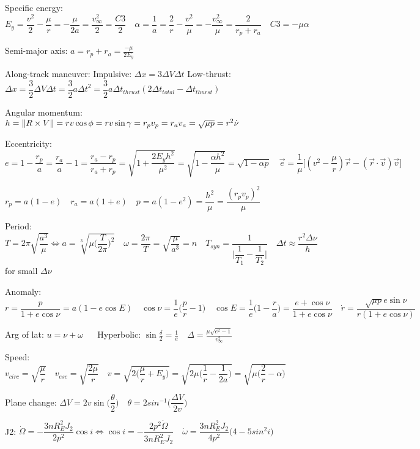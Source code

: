 \documentclass[11pt,landscape]{article}
\begin{document}
Specific energy:
$
E_y 
= \dfrac{v^2}{2} - \dfrac{\mu}{r} 
= -\dfrac{\mu}{2a} 
= \dfrac{v_{\infty}^2}{2} 
= \dfrac{C3}{2}
\quad
\alpha
= \dfrac{1}{a}
= \dfrac{2}{r} - \dfrac{v^2}{\mu}
= -\dfrac{v_{\infty}^2}{\mu}
= \dfrac{2}{r_p+r_a}
\quad
C3 = -\mu\alpha
$

Semi-major axis:
$
a
= r_p + r_a
= \frac{-\mu}{2 E_y}
$


Along-track maneuver:
\quad
Impulsive:
$\Delta x = 3 \Delta V \Delta t$
\quad
Low-thrust:
$
\Delta x 
= \dfrac{3}{2} \Delta V \Delta t 
= \dfrac{3}{2} a {\Delta t}^2
= \dfrac{3}{2} a \Delta t_{thrust} ( 2\Delta t_{total} - \Delta t_{thurst} )
$

Angular momentum:
$
h
=\left\lVert R \times V \right\rVert
=rv \cos \phi
=rv \sin \gamma
=r_p v_p
=r_a v_a
=\sqrt{\mu p}
=r^2 \dot{\nu}
$

Eccentricity:
$
e 
=1-\dfrac{r_p}{a}
=\dfrac{r_a}{a}-1
=\dfrac{r_a-r_p}{r_a+r_p}
=\sqrt{1+\dfrac{2 E_y h^2}{\mu^2}}
=\sqrt{1-\dfrac{\alpha h^2}{\mu}}
=\sqrt{1-\alpha p}
\quad
\vec{e} = \dfrac{1}{\mu} 
\big[ (v^2-\dfrac{\mu}{r})\vec{r} - (\vec{r} \cdot \vec{v})\vec{v} \big]
$

$
r_p = a(1-e)
\quad
r_a = a(1+e)
\quad
p 
= a(1-e^2)
= \dfrac{h^2}{\mu}
= \dfrac{(r_p v_p)^2}{\mu}
$

Period:
$
T=2\pi\sqrt{\dfrac{a^3}{\mu}}
\Leftrightarrow
a = \sqrt[3]{\mu \big( \dfrac{T}{2\pi} \big)^2} 
\quad
\omega 
= \dfrac{2\pi}{T}
= \sqrt{\dfrac{\mu}{a^3}}
= n
\quad
T_{syn}=\dfrac{1}{\big| \dfrac{1}{T_1} - \dfrac{1}{T_2} \big|}
\quad
\Delta t \approx \dfrac{r^2 \Delta\nu}{h}$ for small $\Delta\nu$

Anomaly:
$
r = \dfrac{p}{1+e\cos\nu} = a(1-e\cos E)
\quad
\cos\nu = \dfrac{1}{e} \big( \dfrac{p}{r}-1 \big)
\quad
\cos E = \dfrac{1}{e} \big( 1- \dfrac{r}{a} \big)
= \dfrac{e+\cos\nu}{1+e\cos\nu}
\quad
\dot{r} = \dfrac{\sqrt{\mu p} e \sin\nu}{r(1+e\cos\nu)}
\quad$

Arg of lat: $u = \nu + \omega$
$\quad$
Hyperbolic:
$
\sin \frac{\delta}{2} = \frac{1}{e}
\quad
\Delta = \frac{\mu \sqrt{e^2 - 1}}{v_{\infty}^2}
$

Speed:
$
v_{circ}=\sqrt{\dfrac{\mu}{r}}
\quad
v_{esc}=\sqrt{\dfrac{2\mu}{r}}
\quad
v
= \sqrt{2 \big( \dfrac{\mu}{r} + E_y \big) }
= \sqrt{2\mu \big( \dfrac{1}{r} - \dfrac{1}{2a} \big) }
= \sqrt{\mu \big( \dfrac{2}{r} - \alpha \big) }
$

Plane change:
$
\Delta V = 2 v \sin \big( \dfrac{\theta}{2} \big)
\quad
\theta = 2 sin^{-1} \big( \dfrac{\Delta V}{2v} \big)
$

J2:
$
\dot{\Omega} = - \dfrac{3 n R_E^2 J_2}{2 p^2} \cos i
\Leftrightarrow
\cos i = - \dfrac{2 p^2 \dot{\Omega}}{3 n R_E^2 J_2}
\quad
\dot{\omega} = \dfrac{3 n R_E^2 J_2}{4 p^2} \big( 4 - 5 sin^2 i \big)
$
\end{document}
